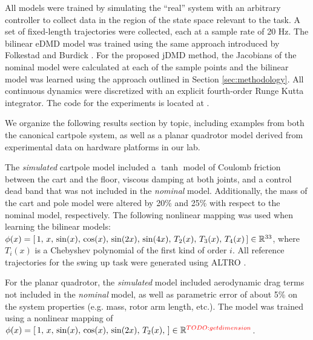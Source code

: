 \documentclass{article}
\begin{document}
All models were trained by simulating the ``real'' system with an arbitrary controller to 
collect data in the region of the state space relevant to the task. A set of fixed-length 
trajectories were collected, each at a sample rate of 20 Hz. The bilinear eDMD model was
trained using the same approach introduced by Folkestad and Burdick \cite{Folkestad2021}.
For the proposed jDMD method, the Jacobians of the nominal model were calculated at each of
the sample points and the bilinear model was learned using the approach outlined in Section
\ref{sec:methodology}.  All continuous dynamics were discretized with an explicit
fourth-order Runge Kutta integrator. The code for the experiments is located at
.  

We organize the following results section by topic, including
examples from both the canonical cartpole system, as well as a planar quadrotor model
derived from experimental data on hardware platforms in our lab.

The \textit{simulated} cartpole model included a $\tanh$ model of Coulomb friction between
the cart and the floor, viscous damping at both joints, and a control dead band that was not
included in the \textit{nominal} model. Additionally, the mass of the cart and pole model
were altered by 20\% and 25\% with respect to the nominal model, respectively.  The
following nonlinear mapping was used when learning the bilinear models: 
$\phi(x) = [\, 1,\,
x,\, \sin(x),\, \cos(x),\, \sin(2x),\, \sin(4x),\, T_2(x),\, T_3(x),\, T_4(x)\, ] \in
\mathbb{R}^{33}$, where $T_i(x)$ is a Chebyshev polynomial of the first kind of order $i$. 
All reference trajectories for the swing up task were generated using ALTRO 
\cite{Howell2019,Jackson2021}.

For the planar quadrotor, the \textit{simulated} model included aerodynamic drag terms not
included in the \textit{nominal} model, as well as parametric error of about 5\% on the
system properties (e.g. mass, rotor arm length, etc.). The model was trained using a 
nonlinear mapping of $\phi(x) = [\, 1,\,
x,\, \sin(x),\, \cos(x),\, \sin(2x),\, T_2(x),\, ] \in
\mathbb{R}^{\textcolor{red}{TODO: get dimension}}$. 


\end{document}
